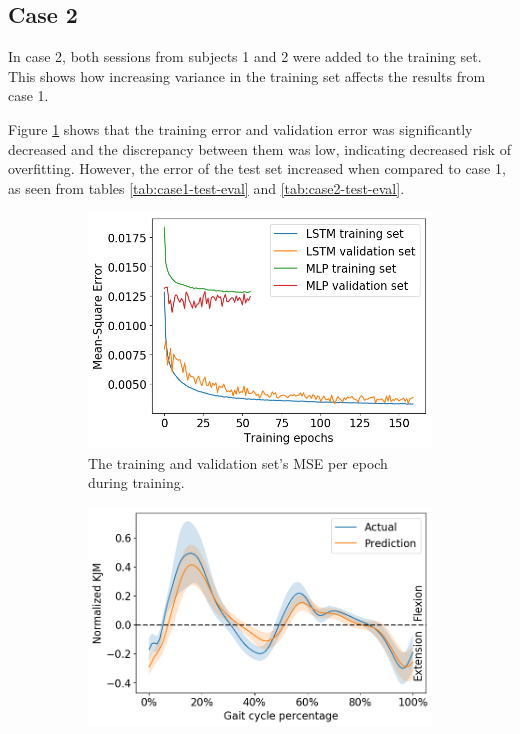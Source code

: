 \documentclass[../main.tex]{subfiles}
\begin{document}
\subsection{Case 2}
\label{sec:results-case2}
In case 2, both sessions from subjects 1 and 2 were added to the training set.
This shows how increasing variance in the training set affects the results from case 1.

Figure \ref{fig:case2-training-performance} shows that the training error and validation error was significantly decreased and the discrepancy between them was low, indicating decreased risk of overfitting.
However, the error of the test set increased when compared to case 1, as seen from tables \ref{tab:case1-test-eval} and \ref{tab:case2-test-eval}.
\begin{figure}[!htb]
     \centering
     \begin{subfigure}[b]{0.475\textwidth}
         \centering
         \includegraphics[width=\textwidth]{img/results/training_history/Case2_LSTMvsMLP_training.png}
         \caption{The training and validation set's \ac{MSE} per epoch during training.}
         \label{fig:case2-training-performance}
     \end{subfigure}
     \hfill
     \begin{subfigure}[b]{0.515\textwidth}
         \centering
         \includegraphics[width=\textwidth]{img/results/test_prediction_evaluation/Case2_LSTM_test_prediction.png}

\end{subfigure}
\end{figure}
\end{document}
